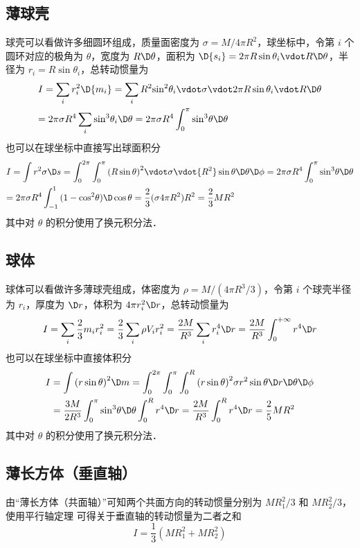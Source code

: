 \subsection{薄球壳}
球壳可以看做许多细圆环组成，质量面密度为 $\sigma  = M/4\pi {R^2}$，球坐标中，令第 $i$ 个圆环对应的极角为 $\theta$，宽度为 $R\D \theta$，面积为 $\D{s_i} = 2\pi R\sin {\theta _i} \vdot R\D\theta$，半径为 ${r_i} = R\sin {\theta _i}$，总转动惯量为
\begin{equation}\label{ExMI_star}
\begin{gathered}
  I = \sum\limits_i {r_i^2\D{m_i}}  = \sum\limits_i {{R^2}{{\sin }^2}{\theta _i} \vdot \sigma  \vdot 2\pi R\sin {\theta _i} \vdot R\D\theta }  \hfill \\
   = 2\pi \sigma {R^4}\sum\limits_i {{{\sin }^3}{\theta _i}\D\theta }  = 2\pi \sigma {R^4}\int_0^\pi  {{{\sin }^3}\theta \D\theta }  \hfill \\ 
\end{gathered}
\end{equation}
也可以在球坐标中直接写出球面积分
\begin{equation}
\begin{gathered}
  I = \int {{r^2}\sigma \D s}  = \int_0^{2\pi } {\int_0^\pi  {{{(R\sin \theta )}^2} \vdot \sigma  \vdot {R^2}\sin \theta \D\theta \D\phi } }  = 2\pi \sigma {R^4}\int_0^\pi  {{{\sin }^3}\theta \D\theta }  \hfill \\
   = 2\pi \sigma {R^4}\int_{ - 1}^1 {(1 - {{\cos }^2}\theta )\D\cos \theta }  = \frac{2}{3}(\sigma 4\pi {R^2}){R^2} = \frac{2}{3}M{R^2} \hfill \\ 
\end{gathered}
\end{equation}
其中对 $\theta$ 的积分使用了换元积分法．%

\subsection{球体}
球体可以看做许多薄球壳组成，体密度为 $\rho  = M/(4\pi {R^3}/3)$，令第 $i$ 个球壳半径为 $r_i$，厚度为 $\D r$，体积为 $4\pi r_i^2\D r$，总转动惯量为
\begin{equation}
I = \sum\limits_i {\frac{2}{3}{m_i}r_i^2}  = \frac{2}{3}\sum\limits_i {\rho {V_i}r_i^2}  = \frac{{2M}}{{{R^3}}}\sum\limits_i {r_i^4\D r}  = \frac{{2M}}{{{R^3}}}\int_0^{ + \infty } {{r^4}\D r}
\end{equation}
也可以在球坐标中直接体积分
\begin{equation}
\begin{aligned}
I &= \int {{{(r\sin \theta )}^2}\D m}  = \int_0^{2\pi } {\int_0^\pi  {\int_0^R {{{(r\sin \theta )}^2}\sigma {r^2}\sin \theta \D r\D\theta \D\phi } } } \\
&= \frac{{3M}}{{2{R^3}}}\int_0^\pi  {{{\sin }^3}\theta \D\theta } \int_0^R {{r^4}\D r}  =\frac{{2M}}{{{R^3}}}\int_0^R {{r^4}\D r}  = \frac{2}{5}M{R^2}
\end{aligned}
\end{equation}
其中对 $\theta$ 的积分使用了换元积分法．%

\subsection{薄长方体（垂直轴）}
由“薄长方体（共面轴）”可知两个共面方向的转动惯量分别为 $MR_1^2/3$ 和 $MR_2^2/3$，使用平行轴定理%
可得关于垂直轴的转动惯量为二者之和
\begin{equation}
I = \frac{1}{3} (MR_1^2+MR_2^2)
\end{equation}